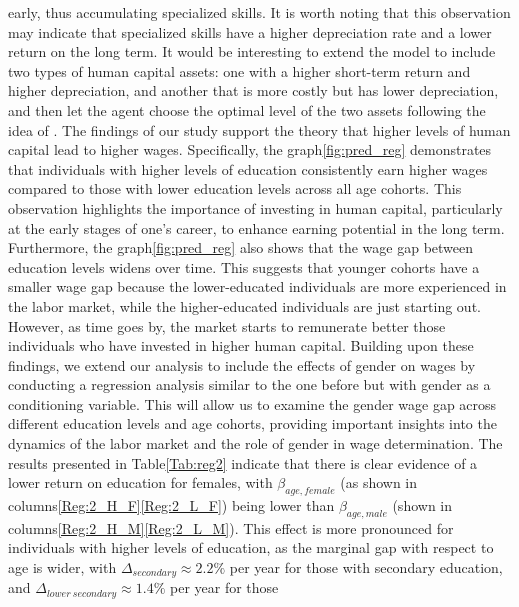 \documentclass[12pt]{article}
\begin{document}
early, thus accumulating specialized skills. It is worth noting that this observation may indicate that specialized
skills have a higher depreciation rate and a lower return on the long term. It would be interesting to extend the model
to include two types of human capital assets: one with a higher short-term return and higher depreciation, and another
that is more costly but has lower depreciation, and then let the agent choose the optimal level of the two assets
following the idea of \citet{Kruger}.
\newline
The findings of our study support the theory that higher levels of human capital lead to higher wages. Specifically, the
graph\ref{fig:pred_reg} demonstrates that individuals with higher levels of education consistently earn higher wages compared to those
with lower education levels across all age cohorts. This observation highlights the importance of investing in human
capital, particularly at the early stages of one's career, to enhance earning potential in the long term.
\newline
Furthermore, the graph\ref{fig:pred_reg} also shows that the wage gap between education levels widens over time. This suggests that
younger cohorts have a smaller wage gap because the lower-educated individuals are more experienced in the labor market,
while the higher-educated individuals are just starting out. However, as time goes by, the market starts to remunerate
better those individuals who have invested in higher human capital.
\newline
Building upon these findings, we extend our analysis to include the effects of gender on wages by conducting a
regression analysis similar to the one before but with gender as a conditioning variable. This will allow us to examine
the gender wage gap across different education levels and age cohorts, providing important insights into the dynamics of
the labor market and the role of gender in wage determination.
\newline
The results presented in Table\ref{Tab:reg2} indicate that there is clear evidence of a lower return on education for
females, with $\beta_{age,female}$ (as shown in columns\ref{Reg:2_H_F}\ref{Reg:2_L_F}) being lower than
$\beta_{age,male}$ (shown in columns\ref{Reg:2_H_M}\ref{Reg:2_L_M}). This effect is more pronounced for individuals
with higher levels of education, as the marginal gap with respect to age is wider, with $\Delta_{secondary} \approx
2.2\%$ per year for those with secondary education, and $\Delta_{lower\ secondary} \approx 1.4\%$ per year for those
\end{document}

